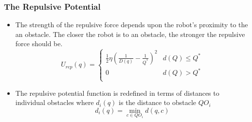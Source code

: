 \documentclass[handout]{beamer}
\begin{document}
  \begin{frame}
    \frametitle{The Repulsive Potential}
    \begin{itemize}
      \item The strength of the repulsive force depends upon the robot's proximity to the an obstacle. The closer the robot is to an obstacle, the stronger the repulsive force should be.
      \begin{equation}
        U_{rep}(q) =
          \begin{cases}
            \frac{1}{2}\eta (\frac{1}{D(q)} - \frac{1}{Q^{*}})^{2}  & d(Q) \leq Q^{*}\\
            0 & d(Q) > Q^{*}\\
          \end{cases}       
      \end{equation}
      \item The repulsive potential function is redefined in terms of distances to individual obstacles where $d_{i}(q)$ is the distance to obstacle $QO_{i}$
      \begin{equation}
        d_{i}(q) = \min_{c \in QO_{i}} d(q,c) 
      \end{equation}
    \end{itemize}
    \centering

    

    

  \end{frame}
\end{document}
